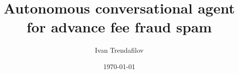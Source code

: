 \documentclass[abbrevs,bsc,logo,deptreport]{styles/infthesis}
\title{Autonomous conversational agent for advance fee fraud spam}
\author{Ivan Trendafilov}
\date{\today}
\begin{document}
  \begin{preliminary}
    \maketitle
  
    
    \standarddeclaration
    \tableofcontents
  \end{preliminary}

  
  
  
  
  
  
  
  
  


  \appendix
  
  
  
\end{document}
